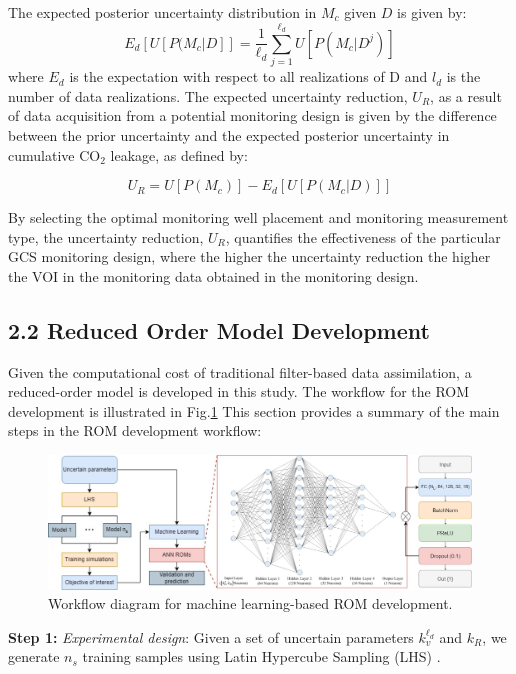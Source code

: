 \documentclass[10pt, twoside]{article}
\begin{document}
The expected posterior uncertainty distribution in $M_c$ given $D$ is given by:
\begin{equation} \label{eq:2}
    E_d [U [ P(M_c \vert D]] = \frac{1}{\ell_d} \sum_{j=1}^{\ell_d} U [P (M_c \vert D^j) ]
\end{equation}
where $E_d$ is the expectation with respect to all realizations of D and $l_d$ is the number of data realizations. The expected uncertainty reduction, $U_R$, as a result of data acquisition from a potential monitoring design is given by the difference between the prior uncertainty and the expected posterior uncertainty in cumulative CO$_2$ leakage, as defined by:

\begin{equation} \label{eq:3}
    U_R = U[P(M_c)] - E_d [U [ P(M_c \vert D)]]
\end{equation}

By selecting the optimal monitoring well placement and monitoring measurement type, the uncertainty reduction, $U_R$, quantifies the effectiveness of the particular GCS monitoring design, where the higher the uncertainty reduction the higher the VOI in the monitoring data obtained in the monitoring design.

\subsection*{2.2 Reduced Order Model Development}
Given the computational cost of traditional filter-based data assimilation, a reduced-order model is developed in this study. The workflow for the ROM development is illustrated in Fig.\ref{mlrom} This section provides a summary of the main steps in the ROM development workflow:

\begin{figure} [H]
\centering
\includegraphics[width=16cm]{Figure 1.jpg}
\caption{Workflow diagram for machine learning-based ROM development.}
\label{mlrom}
\end{figure}

\textbf{Step 1:} \textit{Experimental design}: Given a set of uncertain parameters $k_{v}^{\ell_d}$ and $k_R$, we generate $n_s$ training samples using Latin Hypercube Sampling (LHS) \citep{Iman2008, Helton2003LatinSystems}.
\end{document}
